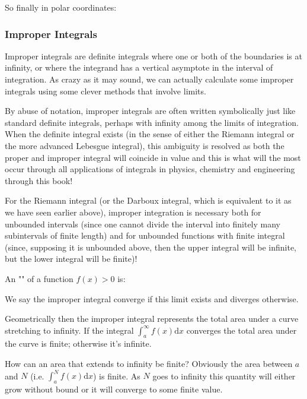 	So finally in polar coordinates:
	
	
	\subsubsection{Improper Integrals}
	Improper integrals are definite integrals where one or both of the boundaries is at infinity, or where the integrand has a vertical asymptote in the interval of integration. As crazy as it may sound, we can actually calculate some improper integrals using some clever methods that involve limits.
	
	By abuse of notation, improper integrals are often written symbolically just like standard definite integrals, perhaps with infinity among the limits of integration. When the definite integral exists (in the sense of either the Riemann integral or the more advanced Lebesgue integral), this ambiguity is resolved as both the proper and improper integral will coincide in value and this is what will the most occur through all applications of integrals in physics, chemistry and engineering through this book!
	
	For the Riemann integral (or the Darboux integral, which is equivalent to it as we have seen earlier above), improper integration is necessary both for unbounded intervals (since one cannot divide the interval into finitely many subintervals of finite length) and for unbounded functions with finite integral (since, supposing it is unbounded above, then the upper integral will be infinite, but the lower integral will be finite)!
	
	An "" of a function $f(x) > 0$ is:
	
	We say the improper integral converge if this limit exists and diverges otherwise.
	
	Geometrically then the improper integral represents the total area under a curve stretching to infinity. If the integral $\int_a^\infty f(x)\mathrm{d}x$ converges the total area under the curve is finite; otherwise it's infinite.
	
	How can an area that extends to infinity be finite?  Obviously the area between $a$ and $N$ (i.e. $\int_a^N f(x)\mathrm{d}x$) is finite.  As $N$ goes to infinity this quantity will either grow without bound or it will converge to some finite value. 
	
